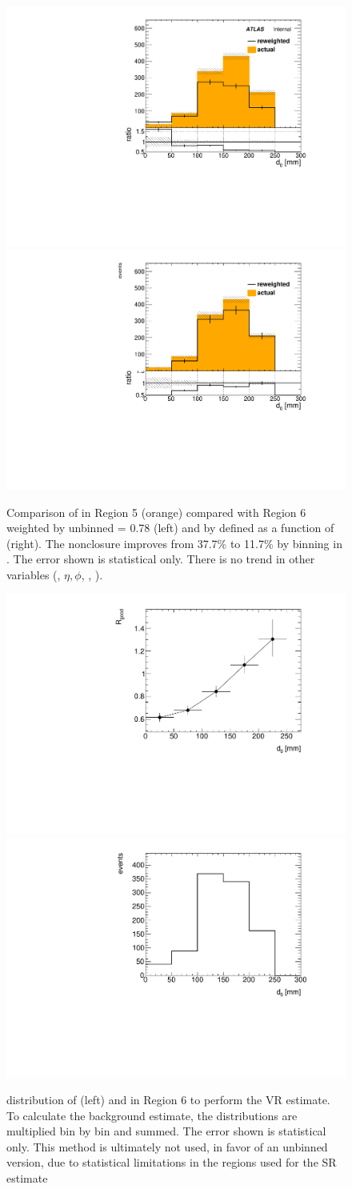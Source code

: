 \begin{figure}[htbp]
\centering
\includegraphics[width=.48\textwidth]{figures/cosmics/ratio_d0.pdf}
\includegraphics[width=.48\textwidth]{figures/cosmics/d0_ratio_binned.pdf}
\caption{Comparison of \absdz in Region 5 (orange) compared with Region 6 weighted by unbinned \rgood = 0.78 (left) and by \rgood defined as a function of \absdz (right). The nonclosure improves from 37.7\% to 11.7\% by binning \rgood in \absdz. The error shown is statistical only. There is no trend in other variables (\pt, $\eta, \phi$, \z, \tavg).}
\label{fig:cos-nonclosure-plots}
\end{figure}

\begin{figure}[htbp]
\centering
\includegraphics[width=.48\textwidth]{figures/cosmics/d0_VR_v4_rgood.pdf}
\includegraphics[width=.48\textwidth]{figures/cosmics/d0_VR_v4_2mu.pdf}
\caption{\absdz distribution of \rgood (left) and \mt in Region 6 to perform the VR estimate. To calculate the background estimate, the distributions are multiplied bin by bin and summed. The error shown is statistical only. This method is ultimately not used, in favor of an unbinned version, due to statistical limitations in the regions used for the SR estimate}
\label{fig:VR-rgood}
\end{figure}

